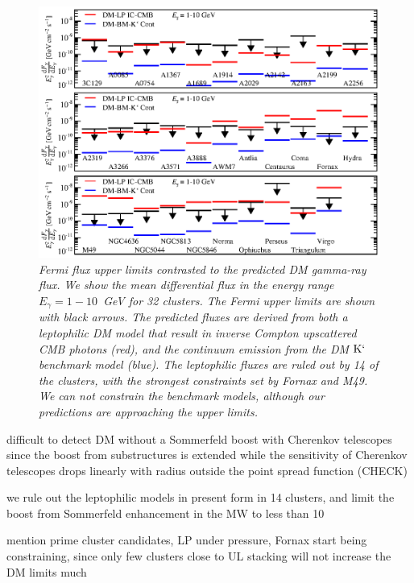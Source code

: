 \documentclass[10pt,aps,pra,reprint,amsmath,amsfonts,amssymb,showpacs]{revtex4-1}
\newcommand{\rmn}{\mathrm}
\newcommand{\Kp}{\rmn{K}`}
\begin{document}
\begin{figure}
\begin{minipage}{2.0\columnwidth}
  \includegraphics[width=0.99\columnwidth]{figures/Fermi.comp.DM.eps}
  \caption{\it Fermi flux upper limits contrasted to the predicted DM
    gamma-ray flux. We show the mean differential flux in the energy
    range $E_\gamma=1-10$~GeV for 32 clusters. The Fermi upper limits
    are shown with black arrows. The predicted fluxes are derived from
    both a leptophilic DM model that result in inverse Compton
    upscattered CMB photons (red), and the continuum emission from the
    DM $\Kp$ benchmark model (blue). The leptophilic fluxes are ruled
    out by 14 of the clusters, with the strongest constraints set by
    Fornax and M49. We can not constrain the benchmark models,
    although our predictions are approaching the upper limits.}
 \label{fig14}
\end{minipage}
\end{figure}
 difficult to detect DM without a Sommerfeld boost with Cherenkov
 telescopes since the boost from substructures is extended while the
 sensitivity of Cherenkov telescopes drops linearly with radius
 outside the point spread function (CHECK)

we rule out the leptophilic models in present form in 14 clusters,
 and limit the boost from Sommerfeld enhancement in the MW to less
 than 10

mention prime cluster candidates, LP under pressure, Fornax start
being constraining, since only few clusters close to UL stacking will
not increase the DM limits much
\end{document}
